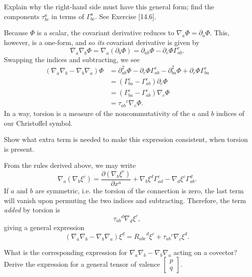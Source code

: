 \documentclass[../the-road-to-reality.tex]{subfiles}
\begin{document}
\begin{questions}
	\question Explain why the right-hand side must have this general form; find the components $\tau^a_{bc}$ in terms of $\Gamma^a_{bc}$. See Exercise [14.6].

	\begin{solution}
		Because $\Phi$ is a scalar, the covariant derivative reduces to $\nabla_a\Phi = \partial_a\Phi$. This, however, is a one-form, and so \textit{its} covariant derivative is given by
		\[
			\nabla_a\nabla_b\Phi = \nabla_a(\partial_b\Phi) = \partial_{ab}\Phi - \partial_c\Phi\Gamma^c_{ab}
		.\] 
		Swapping the indices and subtracting, we see
		\begin{align*}
			(\nabla_a\nabla_b - \nabla_b\nabla_a)\Phi &=  \partial^2_{ab}\Phi - \partial_c\Phi\Gamma^c_{ab} - \partial^2_{ba}\Phi + \partial_c\Phi\Gamma^c_{ba} \\
								  &= (\Gamma^c_{ba} - \Gamma^c_{ab})\partial_c\Phi \\
								  &= (\Gamma^c_{ba} - \Gamma^c_{ab})\nabla_c\Phi \\
								  &= {\tau_{ab}}^c\nabla_c\Phi
		.\end{align*}
		In a way, torsion is a measure of the noncommutativity of the $a$ and $b$ indices of our Christoffel symbol.
	\end{solution}

	\question Show what extra term is needed to make this expression consistent, when torsion is present.

	\begin{solution}
		From the rules derived above, we may write
		\[
		\nabla_a(\nabla_b\xi^c) = \frac{\partial(\nabla_b\xi^c)}{\partial{x^a}} + \nabla_b\xi^d\Gamma^c_{ad} - \nabla_d\xi^c\Gamma^d_{ab}
		.\] 
		If $a$ and $b$ are symmetric, i.e. the torsion of the connection is zero, the last term will vanish upon permuting the two indices and subtracting. Therefore, the term \textit{added} by torsion is
		\[
		{\tau_{ab}}^d\nabla_d\xi^c
		,\] 
		giving a general expression
		\[
			(\nabla_a\nabla_b - \nabla_b\nabla_a)\xi^d = {R_{abc}}^d\xi^c + {\tau_{ab}}^c\nabla_c\xi^d
		.\] 
	\end{solution}

	\question What is the corresponding expression for $\nabla_a\nabla_b - \nabla_b\nabla_a$ acting on a covector? Derive the expression for a general tensor of valence $\begin{bmatrix} p \\ q \end{bmatrix}$.


\end{questions}
\end{document}
